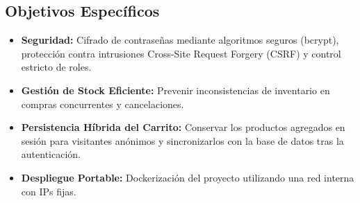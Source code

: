 \subsection{Objetivos Específicos}
\begin{itemize}
    \item \textbf{Seguridad:} Cifrado de contraseñas mediante algoritmos seguros (bcrypt), protección contra intrusiones Cross-Site Request Forgery (CSRF) y control estricto de roles.
    \item \textbf{Gestión de Stock Eficiente:} Prevenir inconsistencias de inventario en compras concurrentes y cancelaciones.
    \item \textbf{Persistencia Híbrida del Carrito:} Conservar los productos agregados en sesión para visitantes anónimos y sincronizarlos con la base de datos tras la autenticación.
    \item \textbf{Despliegue Portable:} Dockerización del proyecto utilizando una red interna con IPs fijas.
\end{itemize}
